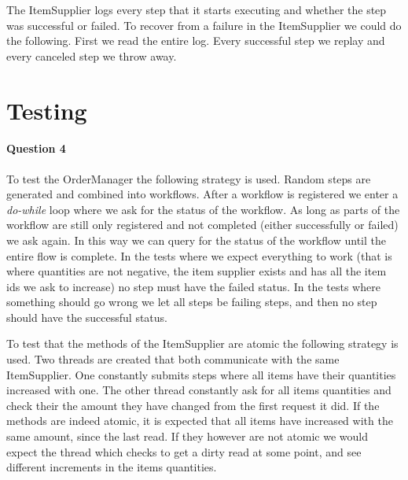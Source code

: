 \documentclass[a4paper, 11pt]{article}
\begin{document}

The ItemSupplier logs every step that it starts executing and whether the step was successful or failed. To recover from a failure in the ItemSupplier we could do the following. First we read the entire log. Every successful step we replay and every canceled step we throw away.


\pagebreak
\section{Testing} %
\label{sec:testing}

\paragraph{Question 4} %
\label{par:question_4}

To test the OrderManager the following strategy is used. Random steps are generated and combined into workflows. After a workflow is registered we enter a \textit{do-while} loop where we ask for the status of the workflow. As long as parts of the workflow are still only registered and not completed (either successfully or failed) we ask again. In this way we can query for the status of the workflow until the entire flow is complete. In the tests where we expect everything to work (that is where quantities are not negative, the item supplier exists and has all the item ids we ask to increase) no step must have the failed status. In the tests where something should go wrong we let all steps be failing steps, and then no step should have the successful status.

To test that the methods of the ItemSupplier are atomic the following strategy is used. Two threads are created that both communicate with the same ItemSupplier. One constantly submits steps where all items have their quantities increased with one. The other thread constantly ask for all items quantities and check their the amount they have changed from the first request it did. If the methods are indeed atomic, it is expected that all items have increased with the same amount, since the last read. If they however are not atomic we would expect the thread which checks to get a dirty read at some point, and see different increments in the items quantities.
\end{document}
